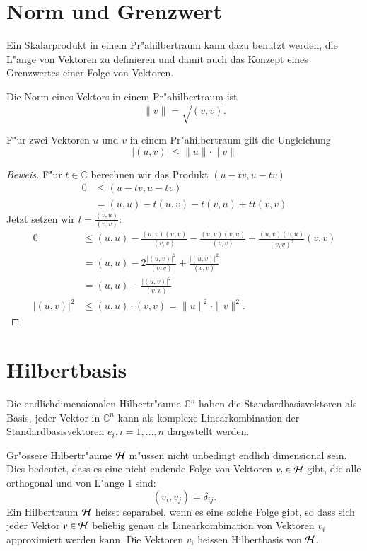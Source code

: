 \section{Norm und Grenzwert}
Ein Skalarprodukt in einem Pr"ahilbertraum kann dazu benutzt werden,
die L"ange von Vektoren zu definieren und damit auch das Konzept eines
Grenzwertes einer Folge von Vektoren.

\begin{definition}
Die Norm eines Vektors in einem Pr"ahilbertraum ist
\[
\| v\| = \sqrt{(v,v)}.
\]
\end{definition}

\begin{satz} F"ur zwei Vektoren $u$ und $v$
in einem Pr"ahilbertraum gilt die Ungleichung
\[
|(u,v)| \le \| u\|\cdot \| v\|
\]
\end{satz}

\begin{proof}[Beweis]
F"ur $t\in\mathbb C$ berechnen wir das Produkt $(u-tv, u-tv)$
\begin{align*}
0&\le (u-tv,u-tv)\\
 &=   (u,u) - t(u,v) - \bar t(v,u) +   t\bar t(v,v) 
\end{align*}
Jetzt setzen wir $t=\frac{(v,u)}{(v,v)}$:
\begin{align*}
0&\le (u,u) - \frac{(u,v)(u,v)}{(v,v)} - \frac{(u,v)(v,u)}{(v,v)} + \frac{(u,v)(v,u)}{(v,v)^2}(v,v)\\
 &=(u,u) - 2\frac{|(u,v)|^2}{(v,v)} +\frac{|(u,v)|^2}{(v,v)}\\
 &=(u,u) -\frac{|(u,v)|^2}{(v,v)}\\
|(u,v)|^2&\le (u,u)\cdot (v,v) = \|u\|^2\cdot \|v\|^2.
\end{align*}
\end{proof}

\section{Hilbertbasis}
Die endlichdimensionalen Hilbertr"aume $\mathbb C^n$ haben die
Standardbasisvektoren als Basis, jeder Vektor in $\mathbb C^n$
kann als komplexe Linearkombination der Standardbasisvektoren
$e_i,i=1,\dots,n$ dargestellt werden.

Gr"ossere Hilbertr"aume $\cal H$ m"ussen nicht unbedingt endlich dimensional
sein. Dies bedeutet, dass es eine nicht endende Folge von Vektoren
$v_i\in\cal H$ gibt, die alle orthogonal und von L"ange $1$ sind:
\[
(v_i,v_j)=\delta_{ij}.
\]
Ein Hilbertraum $\cal H$ heisst separabel, wenn es eine solche Folge
gibt, so dass sich jeder Vektor $v\in\cal H$ beliebig genau als
Linearkombination von Vektoren $v_i$ approximiert werden kann.
Die Vektoren $v_i$ heissen Hilbertbasis von $\cal H$.

